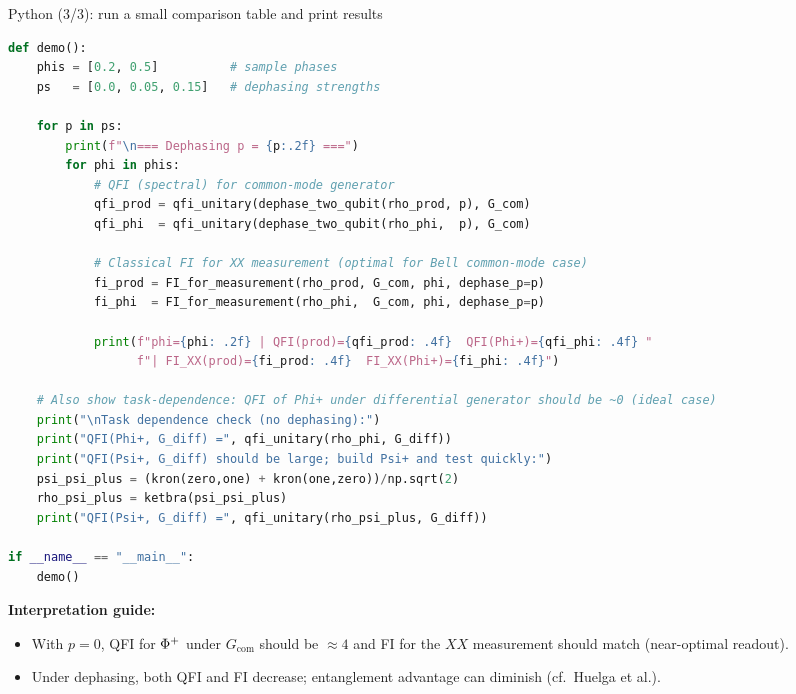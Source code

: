 \documentclass[aspectratio=169]{beamer}
\begin{document}
\begin{frame}[fragile]{Python (3/3): run a small comparison table and print results}
\small
\begin{lstlisting}[language=Python]
def demo():
    phis = [0.2, 0.5]          # sample phases
    ps   = [0.0, 0.05, 0.15]   # dephasing strengths

    for p in ps:
        print(f"\n=== Dephasing p = {p:.2f} ===")
        for phi in phis:
            # QFI (spectral) for common-mode generator
            qfi_prod = qfi_unitary(dephase_two_qubit(rho_prod, p), G_com)
            qfi_phi  = qfi_unitary(dephase_two_qubit(rho_phi,  p), G_com)

            # Classical FI for XX measurement (optimal for Bell common-mode case)
            fi_prod = FI_for_measurement(rho_prod, G_com, phi, dephase_p=p)
            fi_phi  = FI_for_measurement(rho_phi,  G_com, phi, dephase_p=p)

            print(f"phi={phi: .2f} | QFI(prod)={qfi_prod: .4f}  QFI(Phi+)={qfi_phi: .4f} "
                  f"| FI_XX(prod)={fi_prod: .4f}  FI_XX(Phi+)={fi_phi: .4f}")

    # Also show task-dependence: QFI of Phi+ under differential generator should be ~0 (ideal case)
    print("\nTask dependence check (no dephasing):")
    print("QFI(Phi+, G_diff) =", qfi_unitary(rho_phi, G_diff))
    print("QFI(Psi+, G_diff) should be large; build Psi+ and test quickly:")
    psi_psi_plus = (kron(zero,one) + kron(one,zero))/np.sqrt(2)
    rho_psi_plus = ketbra(psi_psi_plus)
    print("QFI(Psi+, G_diff) =", qfi_unitary(rho_psi_plus, G_diff))

if __name__ == "__main__":
    demo()
\end{lstlisting}

\vspace{0.25em}
\textbf{Interpretation guide:}
\begin{itemize}
\item With $p=0$, QFI for $\relax{\Phi^+}$ under $G_{\mathrm{com}}$ should be $\approx 4$ and FI for the $XX$ measurement should match (near-optimal readout).
\item Under dephasing, both QFI and FI decrease; entanglement advantage can diminish (cf.\ Huelga et al.). \citep{Huelga1997PRL}
\end{itemize}
\end{frame}
\end{document}
